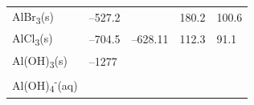 \documentclass[
  9pt,
]{extbook}
\theoremstyle{definition}
\theoremstyle{definition}
\theoremstyle{definition}
\theoremstyle{remark}
\begin{document}
\begin{longtable}[]{@{}lllll@{}}
\begin{minipage}[t]{0.10\columnwidth}
AlBr\textsubscript{3}(s)\strut
\end{minipage} & \begin{minipage}[t]{0.19\columnwidth}\raggedright
--527.2\strut
\end{minipage} & \begin{minipage}[t]{0.20\columnwidth}\raggedright
\strut
\end{minipage} & \begin{minipage}[t]{0.18\columnwidth}\raggedright
180.2\strut
\end{minipage} & \begin{minipage}[t]{0.18\columnwidth}\raggedright
100.6\strut
\end{minipage}\tabularnewline
\begin{minipage}[t]{0.10\columnwidth}\raggedright
AlCl\textsubscript{3}(s)\strut
\end{minipage} & \begin{minipage}[t]{0.19\columnwidth}\raggedright
--704.5\strut
\end{minipage} & \begin{minipage}[t]{0.20\columnwidth}\raggedright
--628.11\strut
\end{minipage} & \begin{minipage}[t]{0.18\columnwidth}\raggedright
112.3\strut
\end{minipage} & \begin{minipage}[t]{0.18\columnwidth}\raggedright
91.1\strut
\end{minipage}\tabularnewline
\begin{minipage}[t]{0.10\columnwidth}\raggedright
Al(OH)\textsubscript{3}(s)\strut
\end{minipage} & \begin{minipage}[t]{0.19\columnwidth}\raggedright
--1277\strut
\end{minipage} & \begin{minipage}[t]{0.20\columnwidth}\raggedright
\strut
\end{minipage} & \begin{minipage}[t]{0.18\columnwidth}\raggedright
\strut
\end{minipage} & \begin{minipage}[t]{0.18\columnwidth}\raggedright
\strut
\end{minipage}\tabularnewline
\begin{minipage}[t]{0.10\columnwidth}\raggedright
Al(OH)\textsubscript{4}\textsuperscript{-}(aq)\strut
\end{minipage} & \begin{minipage}[t]{0.19\columnwidth}\raggedright

\end{minipage}
\end{longtable}
\end{document}
